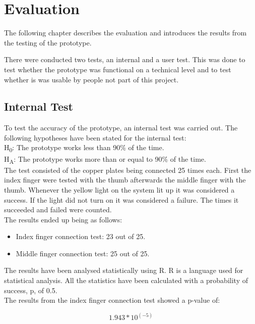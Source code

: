 \chapter{Evaluation}

The following chapter describes the evaluation and introduces the results from the testing of the prototype. 

There were conducted two tests, an internal and a user test. This was done to test whether the prototype was functional on a technical level and to test whether is was usable by people not part of this project. 


\section{Internal Test}

To test the accuracy of the prototype, an internal test was carried out. The following hypotheses have been stated for the internal test: \\

H\textsubscript{0}: The prototype works less than 90\% of the time.\\
H\textsubscript{A}: The prototype works more than or equal to 90\% of the time.\\

The test consisted of the copper plates being connected 25 times each. First the index finger were tested with the thumb afterwards the middle finger with the thumb. Whenever the yellow light on the system lit up it was considered a success. If the light did not turn on it was considered a failure. The times it succeeded and failed were counted.\\

The results ended up being as follows:

\begin{itemize}
\item Index finger connection test: 23 out of 25. 
\item Middle finger connection test: 25 out of 25.\\
\end{itemize}


The results have been analysed statistically using R\citep{R}. R is a language used for statistical analysis. All the statistics have been calculated with a probability of success, p, of 0.5.\\
The results from the index finger connection test showed a p-value of:

\begin{equation}
	1.943*10^(-5)
\end{equation} 

